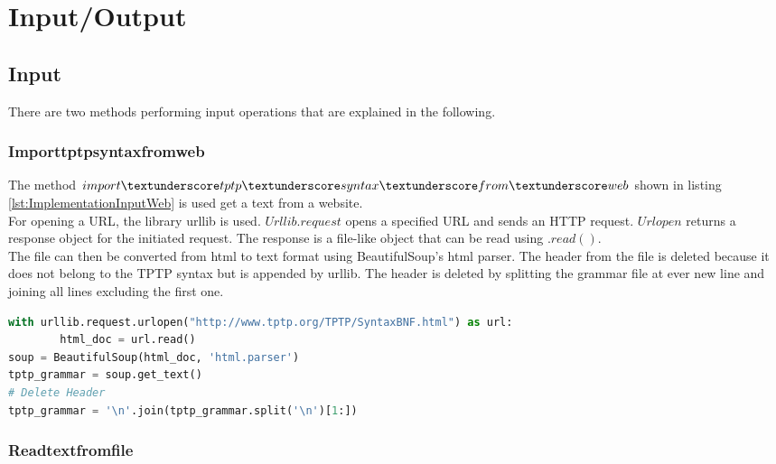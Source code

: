 \section{Input/Output}\label{sec:ImplementationInOut}

\subsection{Input}\label{sec:ImplementationInput}

There are two methods performing input operations that are explained in the following. 

\subsubsection{Import\textunderscore tptp\textunderscore syntax\textunderscore from\textunderscore web}
The method $import\textunderscore tptp\textunderscore syntax\textunderscore from\textunderscore web$ shown in listing \ref{lst:ImplementationInputWeb} is used get a text from a website. \\
For opening a \ac{URL}, the library urllib is used. $Urllib.request$ opens a specified \ac{URL} and sends an HTTP request. $Urlopen$ returns a response object for the initiated request. The response is a file-like object that can be read using $.read()$. \cite{urllib} \\
The file can then be converted from html to text format using BeautifulSoup's html parser.
The header from the file is deleted because it does not belong to the \ac{TPTP} syntax but is appended by urllib. The header is deleted by splitting the grammar file at ever new line and joining all lines excluding the first one. \\

\begin{lstlisting}[language=Python, basicstyle=\scriptsize	,caption= Import TPTP syntax from web,label= lst:ImplementationInputWeb]
with urllib.request.urlopen("http://www.tptp.org/TPTP/SyntaxBNF.html") as url:
        html_doc = url.read()
soup = BeautifulSoup(html_doc, 'html.parser')
tptp_grammar = soup.get_text()
# Delete Header
tptp_grammar = '\n'.join(tptp_grammar.split('\n')[1:])
\end{lstlisting}

\subsubsection{Read\textunderscore text\textunderscore from\textunderscore file}

